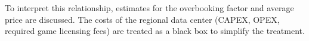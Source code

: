 To interpret this relationship, estimates for the overbooking factor and average price are discussed. The costs of the regional data center (CAPEX, OPEX, required game licensing fees) are treated as a black box to simplify the treatment.








